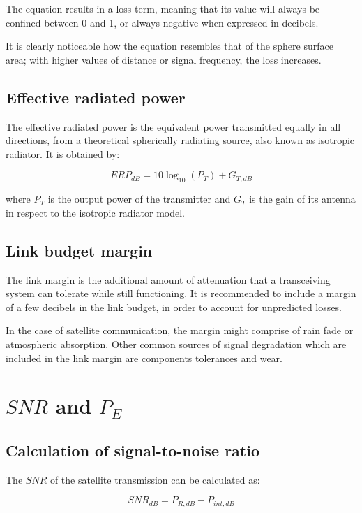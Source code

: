 The equation results in a loss term, meaning that its value will always be confined between 0 and 1, or always negative when expressed in decibels.

It is clearly noticeable how the equation resembles that of the sphere surface area; with higher values of distance or signal frequency, the loss increases.



\subsection{Effective radiated power}
The effective radiated power is the equivalent power transmitted equally in all directions, from a theoretical spherically radiating source, also known as isotropic radiator.
It is obtained by:

\begin{equation}
	{ERP}_{dB} = 10\log_{10}(P_T) + G_{T, dB}
\end{equation}

where $P_T$ is the output power of the transmitter and $G_T$ is the gain of its antenna in respect to the isotropic radiator model.


\subsection{Link budget margin}
The link margin is the additional amount of attenuation that a transceiving system can tolerate while still functioning.
It is recommended to include a margin of a few decibels in the link budget, in order to account for unpredicted losses.

In the case of satellite communication, the margin might comprise of rain fade or atmospheric absorption.
Other common sources of signal degradation which are included in the link margin are components tolerances and wear.


\section{$SNR$ and $P_E$}

\subsection{Calculation of signal-to-noise ratio}
The $SNR$ of the satellite transmission can be calculated as:

\begin{equation}
	{SNR}_{dB} = P_{R, dB} - P_{int, dB}
\end{equation}

